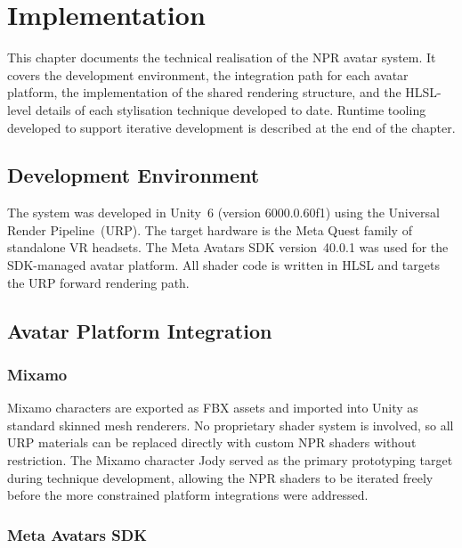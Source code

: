 \chapter{Implementation}
\label{ch:implementation}

This chapter documents the technical realisation of the NPR avatar system. It covers the development environment, the integration path for each avatar platform, the implementation of the shared rendering structure, and the HLSL-level details of each stylisation technique developed to date. Runtime tooling developed to support iterative development is described at the end of the chapter.

\section{Development Environment}
\label{sec:impl_environment}

The system was developed in Unity~6 (version 6000.0.60f1) using the Universal Render Pipeline~(URP). The target hardware is the Meta Quest family of standalone VR headsets. The Meta Avatars SDK version~40.0.1 was used for the SDK-managed avatar platform. All shader code is written in HLSL and targets the URP forward rendering path.

\section{Avatar Platform Integration}
\label{sec:impl_platforms}

\subsection{Mixamo}
\label{sec:impl_mixamo}

Mixamo characters are exported as FBX assets and imported into Unity as standard skinned mesh renderers. No proprietary shader system is involved, so all URP materials can be replaced directly with custom NPR shaders without restriction. The Mixamo character Jody served as the primary prototyping target during technique development, allowing the NPR shaders to be iterated freely before the more constrained platform integrations were addressed.

\subsection{Meta Avatars SDK}
\label{sec:impl_meta}


